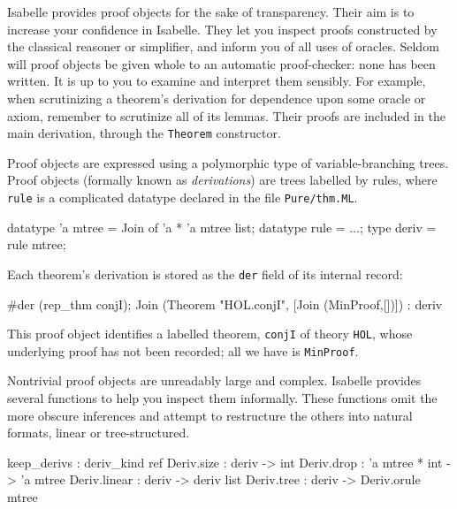 Isabelle provides proof objects for the sake of transparency.  Their aim is to
increase your confidence in Isabelle.  They let you inspect proofs constructed
by the classical reasoner or simplifier, and inform you of all uses of
oracles.  Seldom will proof objects be given whole to an automatic
proof-checker: none has been written.  It is up to you to examine and
interpret them sensibly.  For example, when scrutinizing a theorem's
derivation for dependence upon some oracle or axiom, remember to scrutinize
all of its lemmas.  Their proofs are included in the main derivation, through
the {\tt Theorem} constructor.

Proof objects are expressed using a polymorphic type of variable-branching
trees.  Proof objects (formally known as {\em derivations\/}) are trees
labelled by rules, where {\tt rule} is a complicated datatype declared in the
file {\tt Pure/thm.ML}.
\begin{ttbox} 
datatype 'a mtree = Join of 'a * 'a mtree list;
datatype rule     = \(\ldots\);
type deriv        = rule mtree;
\end{ttbox}
%
Each theorem's derivation is stored as the {\tt der} field of its internal
record: 
\begin{ttbox} 
#der (rep_thm conjI);
{\out Join (Theorem "HOL.conjI", [Join (MinProof,[])]) : deriv}
\end{ttbox}
This proof object identifies a labelled theorem, {\tt conjI} of theory
\texttt{HOL}, whose underlying proof has not been recorded; all we
have is {\tt MinProof}.

Nontrivial proof objects are unreadably large and complex.  Isabelle provides
several functions to help you inspect them informally.  These functions omit
the more obscure inferences and attempt to restructure the others into natural
formats, linear or tree-structured.

\begin{ttbox} 
keep_derivs  : deriv_kind ref
Deriv.size   : deriv -> int
Deriv.drop   : 'a mtree * int -> 'a mtree
Deriv.linear : deriv -> deriv list
Deriv.tree   : deriv -> Deriv.orule mtree
\end{ttbox}

